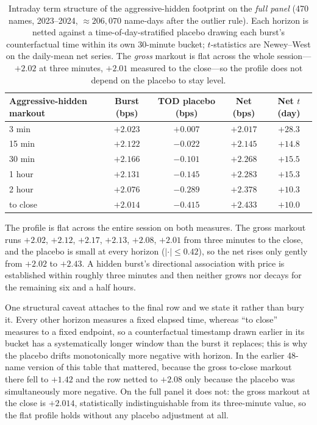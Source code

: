 \documentclass[11pt]{article}
\begin{document}
\begin{table}[htbp]
\centering
\begin{tabular}{lcccc}
\toprule
\textbf{Aggressive-hidden markout} & \textbf{Burst (bps)} & \textbf{TOD placebo (bps)} & \textbf{Net (bps)} & \textbf{Net $t$ (day)} \\
\midrule
3 min    & $+2.023$ & $+0.007$ & $+2.017$ & $+28.3$ \\
15 min   & $+2.122$ & $-0.022$ & $+2.145$ & $+14.8$ \\
30 min   & $+2.166$ & $-0.101$ & $+2.268$ & $+15.5$ \\
1 hour   & $+2.131$ & $-0.145$ & $+2.283$ & $+15.3$ \\
2 hour   & $+2.076$ & $-0.289$ & $+2.378$ & $+10.3$ \\
to close & $+2.014$ & $-0.415$ & $+2.433$ & $+10.0$ \\
\bottomrule
\end{tabular}
\caption{Intraday term structure of the aggressive-hidden footprint on the \emph{full panel}
(470 names, 2023--2024, $\approx\!206{,}070$ name-days after the outlier rule). Each horizon
is netted against a time-of-day-stratified placebo drawing each burst's counterfactual time
within its own 30-minute bucket; $t$-statistics are Newey--West on the daily-mean net series.
The \emph{gross} markout is flat across the whole session---$+2.02$ at three minutes,
$+2.01$ measured to the close---so the profile does not depend on the placebo to stay level.}
\label{tab:hidden_term}
\end{table}

The profile is flat across the entire session on both measures. The gross markout runs
$+2.02$, $+2.12$, $+2.17$, $+2.13$, $+2.08$, $+2.01$ from three minutes to the close, and the
placebo is small at every horizon ($|\cdot| \le 0.42$), so the net rises only gently from
$+2.02$ to $+2.43$. A hidden burst's directional association with price is established within
roughly three minutes and then neither grows nor decays for the remaining six and a half
hours.

One structural caveat attaches to the final row and we state it rather than bury it. Every
other horizon measures a fixed elapsed time, whereas ``to close'' measures to a fixed
endpoint, so a counterfactual timestamp drawn earlier in its bucket has a systematically
longer window than the burst it replaces; this is why the placebo drifts monotonically more
negative with horizon. In the earlier 48-name version of this table that mattered, because
the gross to-close markout there fell to $+1.42$ and the row netted to $+2.08$ only because
the placebo was simultaneously more negative. On the full panel it does not: the gross
markout at the close is $+2.014$, statistically indistinguishable from its three-minute
value, so the flat profile holds without any placebo adjustment at all.
\end{document}
